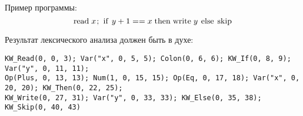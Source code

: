 \documentclass{article}
\newcommand{\llang}[1]{\mbox{\lstinline[mathescape]|#1|}}
\begin{document}
Пример программы: 
$$
\llang{read}\; x \llang{;} \; \llang{if} \; y + 1 == x  \; \llang{then} \; \llang{write} \; y \; \llang{else} \; \llang{skip} 
$$

Результат лексического анализа должен быть в духе: 

\begin{verbatim}
KW_Read(0, 0, 3); Var("x", 0, 5, 5); Colon(0, 6, 6); KW_If(0, 8, 9); Var("y", 0, 11, 11);
Op(Plus, 0, 13, 13); Num(1, 0, 15, 15); Op(Eq, 0, 17, 18); Var("x", 0, 20, 20); KW_Then(0, 22, 25); 
KW_Write(0, 27, 31); Var("y", 0, 33, 33); KW_Else(0, 35, 38); KW_Skip(0, 40, 43)
\end{verbatim}
\end{document}
